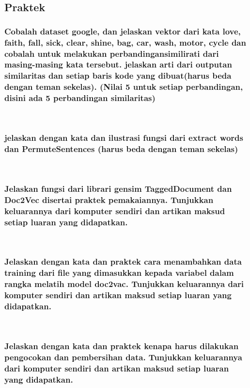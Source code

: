 \subsection{Praktek}

	\subsubsection{Cobalah dataset google, dan jelaskan vektor dari kata love, faith, fall, sick, clear, shine, bag, car, wash, motor, cycle dan cobalah untuk melakukan perbandingansimilirati dari masing-masing kata tersebut. jelaskan arti dari outputan similaritas dan setiap baris kode yang dibuat(harus beda dengan teman sekelas). (Nilai 5 untuk setiap perbandingan, disini ada 5 perbandingan similaritas)}\hfill\\
	
	\subsubsection{jelaskan dengan kata dan ilustrasi fungsi dari extract words dan PermuteSentences (harus beda dengan teman sekelas)
}\hfill\\
	
	\subsubsection{ Jelaskan fungsi dari librari gensim TaggedDocument dan Doc2Vec disertai praktek pemakaiannya. Tunjukkan keluarannya dari komputer sendiri dan artikan
maksud setiap luaran yang didapatkan.}\hfill\\
	
	\subsubsection{Jelaskan dengan kata dan praktek cara menambahkan data training dari file
yang dimasukkan kepada variabel dalam rangka melatih model doc2vac. Tunjukkan keluarannya dari komputer sendiri dan artikan maksud setiap luaran
yang didapatkan.}\hfill\\
	
	\subsubsection{Jelaskan dengan kata dan praktek kenapa harus dilakukan pengocokan dan
pembersihan data. Tunjukkan keluarannya dari komputer sendiri dan artikan
maksud setiap luaran yang didapatkan.}\hfill\\

